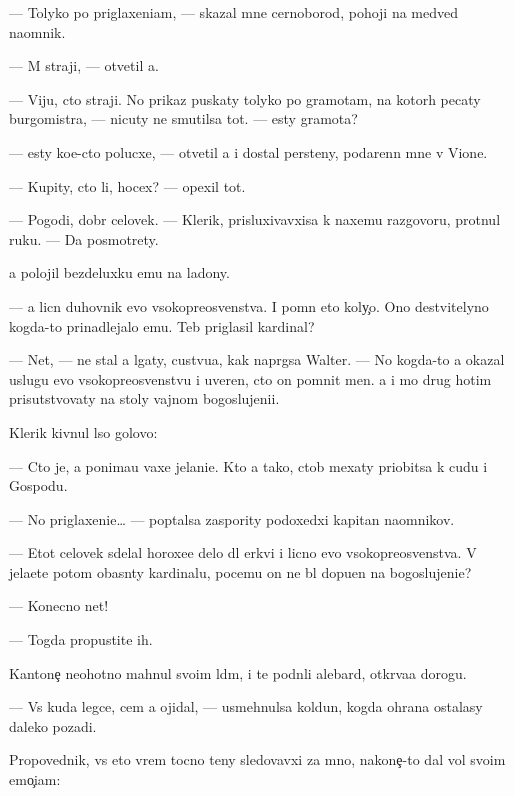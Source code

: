 \documentclass[10pt]{book}
\begin{document}
— Tolyko po priglaxeni{\y}am, — skazal mne cernoborod{\yi}{\y}, pohoji{\y} na medved{\ia} na{\y}omnik.

— M{\yi} straji, — otvetil {\y}a.

— Viju, cto straji. No prikaz puskaty tolyko po gramotam, na kotor{\yi}h pecaty burgomistra, — nicuty ne smutilsa tot. — {\Y}esty gramota?

— {\Y}esty ko{\y}e-cto polucxe, — otvetil {\y}a i dostal persteny, podarenn{\yi}{\y} mne v Vione.

— Kupity, cto li, hocex? — opexil tot.

— Pogodi, dobr{\yi}{\y} celovek. — Klerik, prisluxivavxi{\y}sa k naxemu razgovoru, pro\-t{\ia}\-nul ruku. — Da{\y} posmotrety.

{\Y}a polojil bezdeluxku {\y}emu na ladony.

— {\Y}a licn{\yi}{\y} duhovnik {\y}evo v{\yi}soko\-preosv{\ia}{\x}en\-st\-va. I pomn{\io} eto koly{\c}o. Ono de{\y}stvitelyno kogda-to prinadlejalo {\y}emu. Teb{\ia} priglasil kardinal?

— Net, — ne stal {\y}a lgaty, custvu{\y}a, kak napr{\ia}gsa Walter. — No kogda-to {\y}a okazal uslugu {\y}evo v{\yi}sokopreosv{\ia}{\x}enstvu i uveren, cto on pomnit men{\ia}. {\Y}a i mo{\y} drug hotim prisutstvovaty na stoly vajnom bogoslujeni{\y}i.

Klerik kivnul l{\yi}so{\y} go\-lo\-vo{\y}:

— Cto je, {\y}a ponima{\y}u vaxe jelani{\y}e. Kto {\y}a tako{\y}, ctob{\yi} mexaty priob{\x}itsa k cudu i Gospodu.

— No priglaxeni{\y}e… — pop{\yi}talsa zaspority podoxedxi{\y} kapitan na{\y}om\-ni\-kov.

— Etot celovek sdelal horoxe{\y}e delo dl{\ia} {\C}erkvi i licno {\y}evo v{\yi}soko\-preosv{\ia}{\x}en\-st\-va. V{\yi} jela{\y}ete potom ob{\y}asn{\ia}ty kardinalu, pocemu on ne b{\yi}l dopu{\x}en na bogoslujeni{\y}e?

— Konecno net!

— Togda propustite ih.

Kantone{\c} neohotno mahnul svo{\y}im l{\io}d{\ia}m, i te podn{\ia}li alebard{\yi}, otkr{\yi}va{\y}a do\-ro\-gu.

— Vs{\e} kuda legce, cem {\y}a ojidal, — usmehnulsa koldun, kogda ohrana ostalasy daleko pozadi.

Pro\-po\-ved\-nik, vs{\e} eto vrem{\ia} tocno teny sledovavxi{\y} za mno{\y}, nakone{\c}-to dal vol{\io} svo{\y}im emo{\c}i{\y}am:
\end{document}
